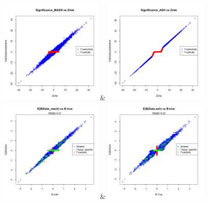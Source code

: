 \begin{figure}[htbp]
\includegraphics[width=5cm]{Figures/scatterplot_fittedtspec.png}&
\includegraphics[width=5cm]{Figures/scatterplot_fittedtspec_ash.png}\\
\includegraphics[width=5cm]{Figures/scatterplot_truthbspec.png}&
\includegraphics[width=5cm]{Figures/scatterplot_TRUTHashbspec.png}

\end{figure}
